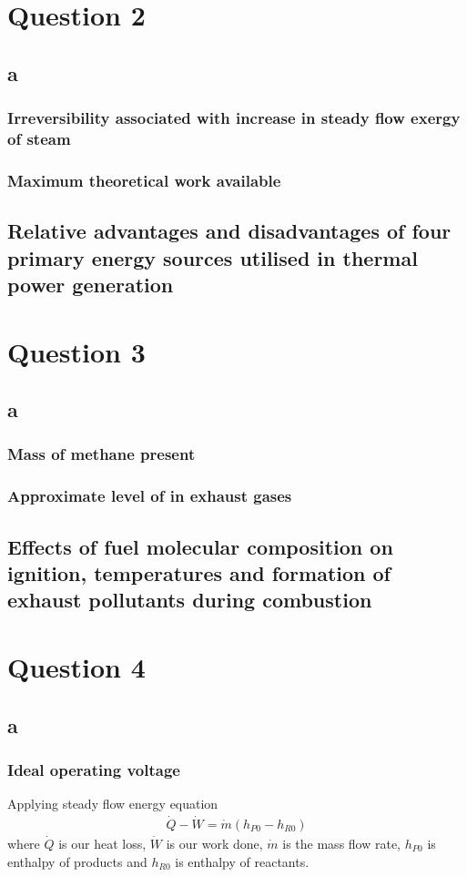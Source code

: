 \documentclass[11pt]{article}
\numberwithin{equation}{section}
\begin{document}
\section{Question 2}
\subsection{a}
\subsubsection{Irreversibility associated with increase in steady flow exergy of steam}

\subsubsection{Maximum theoretical work available}
\subsection{Relative advantages and disadvantages of four primary energy sources utilised in thermal power generation}
\section{Question 3}
\subsection{a}
\subsubsection{Mass of methane present}
\subsubsection{Approximate level of  in exhaust gases}
\subsection{Effects of fuel molecular composition on ignition, temperatures and formation of exhaust pollutants during combustion}
\section{Question 4}
\subsection{a}
\subsubsection{Ideal operating voltage}
Applying steady flow energy equation
\begin{gather}
    \dot{Q} - \dot{W} = \dot{m}\left(h_{P0} - h_{R0}\right)
\end{gather}
where $\dot{Q}$ is our heat loss, $\dot{W}$ is our work done, $\dot{m}$ is the mass flow rate, $h_{P0}$ is enthalpy of products and $h_{R0}$ is enthalpy of reactants. 
\end{document}
